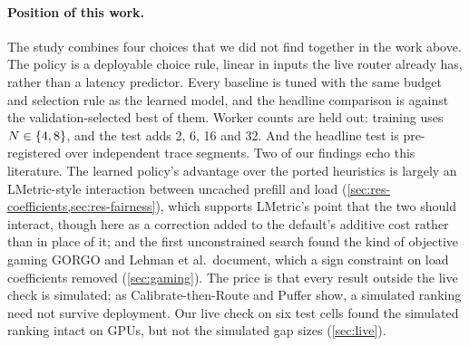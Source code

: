 \paragraph{Position of this work.}
The study combines four choices that we did not find together in the work above. The policy is a
deployable choice rule, linear in inputs the live router already has, rather than a latency
predictor. Every baseline is tuned with the same budget and selection rule as the learned model,
and the headline comparison is against the validation-selected best of them. Worker counts are
held out: training uses $N \in \{4, 8\}$, and the test adds 2, 6, 16 and 32. And the headline
test is pre-registered over independent trace segments. Two of our findings echo this literature.
The learned policy's advantage over the ported heuristics is largely an LMetric-style
interaction between uncached prefill and load (\cref{sec:res-coefficients,sec:res-fairness}), which
supports LMetric's point that the two should interact, though here as a correction added to the
default's additive cost rather than in place of it; and the first unconstrained
search found the kind of objective gaming GORGO and Lehman et al.\ document, which a sign constraint
on load coefficients removed (\cref{sec:gaming}). The price is that every result outside the live
check is simulated; as Calibrate-then-Route and Puffer show, a simulated ranking need not survive
deployment.
Our live check on six test cells found the simulated ranking intact on GPUs, but not the simulated
gap sizes (\cref{sec:live}).
